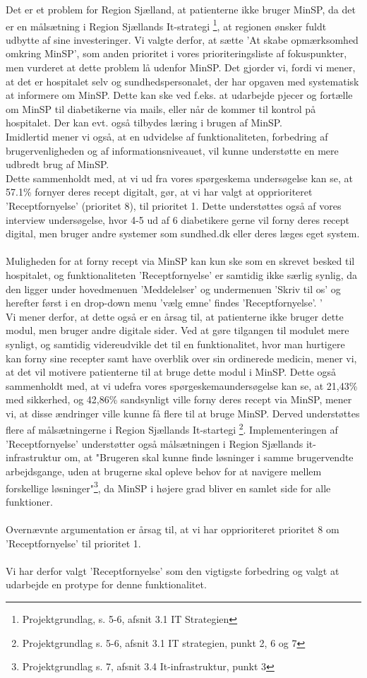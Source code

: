 Det er et problem for Region Sjælland, at patienterne ikke bruger MinSP, da det er en målsætning i Region Sjællands It-strategi \footnote{Projektgrundlag, s. 5-6, afsnit 3.1 IT Strategien}, at regionen ønsker fuldt udbytte af sine investeringer. 
Vi valgte derfor, at sætte 'At skabe opmærksomhed omkring MinSP', som anden prioritet i vores prioriteringsliste af fokuspunkter, men vurderet at dette problem lå udenfor MinSP. Det gjorder vi, fordi vi mener, at det er hospitalet selv og sundhedspersonalet, der har opgaven med systematisk at informere om MinSP. Dette kan ske ved f.eks. at udarbejde pjecer og fortælle om MinSP til diabetikerne via mails, eller når de kommer til kontrol på hospitalet. Der kan evt. også tilbydes læring i brugen af MinSP.\\
Imidlertid mener vi også, at en udvidelse af funktionaliteten, forbedring af brugervenligheden og af informationsniveauet, vil kunne understøtte en mere udbredt brug af MinSP.\\
Dette sammenholdt med, at vi ud fra vores spørgeskema undersøgelse kan se, at 57.1\% fornyer deres recept digitalt, gør, at vi har valgt at opprioriteret 'Receptfornyelse' (prioritet 8), til prioritet 1. Dette understøttes også af vores interview undersøgelse, hvor 4-5 ud af 6 diabetikere gerne vil forny deres recept digital, men bruger andre systemer som sundhed.dk eller deres læges eget system.
\\\\
Muligheden for at forny recept via MinSP kan kun ske som en skrevet besked til hospitalet, og funktionaliteten 'Receptfornyelse' er samtidig ikke særlig synlig, da den ligger under hovedmenuen 'Meddelelser' og undermenuen 'Skriv til os' og herefter først i en drop-down menu 'vælg emne' findes 'Receptfornyelse'. '\\
Vi mener derfor, at dette også er en årsag til, at patienterne ikke bruger dette modul, men bruger andre digitale sider. Ved at gøre tilgangen til modulet mere synligt, og samtidig videreudvikle det til en funktionalitet, hvor man hurtigere kan forny sine recepter samt have overblik over sin ordinerede medicin, mener vi, at det vil motivere patienterne til at bruge dette modul i MinSP. Dette også sammenholdt med, at vi udefra vores spørgeskemaundersøgelse kan se, at 21,43\% med sikkerhed, og 42,86\% sandsynligt ville forny deres recept via MinSP, mener vi, at disse ændringer ville kunne få flere til at bruge MinSP. Derved understøttes flere af målsætningerne i Region Sjællands It-startegi \footnote{Projektgrundlag s. 5-6, afsnit 3.1 IT strategien, punkt 2, 6 og 7}. Implementeringen af 'Receptfornyelse' understøtter også målsætningen i Region Sjællands it-infrastruktur om, at "Brugeren skal kunne finde løsninger i samme brugervendte arbejdsgange, uden at brugerne skal opleve behov for at navigere mellem forskellige løsninger"\footnote{Projektgrundlag s. 7, afsnit 3.4 It-infrastruktur, punkt 3}, da MinSP i højere grad bliver en samlet side for alle funktioner. 
\\ \\
Overnævnte argumentation er årsag til, at vi har opprioriteret prioritet 8 om 'Receptfornyelse' til prioritet 1. 
\\\\
Vi har derfor valgt 'Receptfornyelse' som den vigtigste forbedring og valgt at udarbejde en protype for denne funktionalitet.